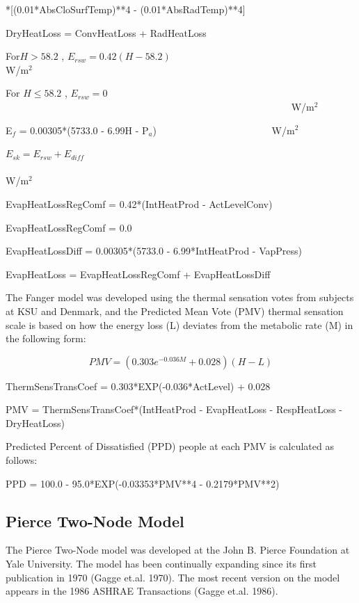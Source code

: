 *{[}(0.01*AbsCloSurfTemp)**4 - (0.01*AbsRadTemp)**4{]}

DryHeatLoss = ConvHeatLoss + RadHeatLoss

For\(H > 58.2\) , \({E_{rsw}} = 0.42(H - 58.2)\) ~~~~~~~~~~~~~~~~~~~~~~~~~~~~~~~~~~~~~ W/m\(^{2}\)

For \(H \le 58.2\) , \({E_{rsw}} = 0\) ~~~~~~~~~~~~~~~~~~~~~~~~~~~~~~~~~~~~~~~~~~~~~~~~~~~~~~~~~~ W/m\(^{2}\) 

{E\(_{f}\) = 0.00305*(5733.0 - 6.99H - P\(_{a}\))}~~~~~~~~~~~~~~~~~~~~~~~ W/m\(^{2}\)

\({E_{sk}} = {E_{rsw}} + {E_{diff}}\) ~~~~~~~~~~~~~~~~~~~~~~~~~~~~~~~~~~~~~~~~~~~~~~~~~~~~~~~~~~~~~~~~~~~~~ W/m\(^{2}\)

EvapHeatLossRegComf = 0.42*(IntHeatProd - ActLevelConv)

EvapHeatLossRegComf = 0.0

EvapHeatLossDiff = 0.00305*(5733.0 - 6.99*IntHeatProd - VapPress)

EvapHeatLoss = EvapHeatLossRegComf + EvapHeatLossDiff

The Fanger model was developed using the thermal sensation votes from subjects at KSU and Denmark, and the Predicted Mean Vote (PMV) thermal sensation scale is based on how the energy loss (L) deviates from the metabolic rate (M) in the following form:

\begin{equation}
PMV = (0.303{e^{ - 0.036M}} + 0.028)(H - L)
\end{equation}

ThermSensTransCoef = 0.303*EXP(-0.036*ActLevel) + 0.028

PMV = ThermSensTransCoef*(IntHeatProd - EvapHeatLoss - RespHeatLoss - DryHeatLoss)

Predicted Percent of Dissatisfied (PPD) people at each PMV is calculated as follows:

PPD = 100.0 - 95.0*EXP(-0.03353*PMV**4 - 0.2179*PMV**2)

\subsection{Pierce Two-Node Model}\label{pierce-two-node-model}

The Pierce Two-Node model was developed at the John B. Pierce Foundation at Yale University. The model has been continually expanding since its first publication in 1970 (Gagge et.al. 1970). The most recent version on the model appears in the 1986 ASHRAE Transactions (Gagge et.al. 1986).

